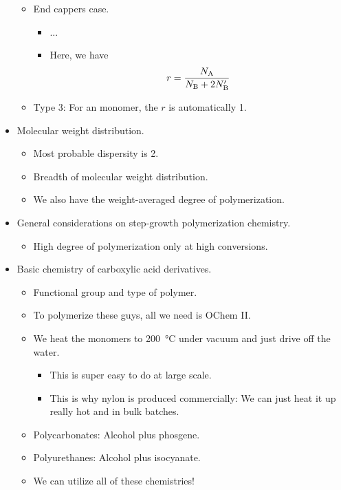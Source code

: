 \documentclass[../notes.tex]{subfiles}
\begin{document}
\begin{itemize}
\begin{itemize}
\begin{itemize}
        \end{itemize}
        \item End cappers case.
        \begin{itemize}
            \item ...
            \item Here, we have
            \begin{equation*}
                r = \frac{N_{\ce{A}}}{N_{\ce{B}}+2N_{\ce{B}}'}
            \end{equation*}
        \end{itemize}
        \item Type 3: For an  monomer, the $r$ is automatically 1.
    \end{itemize}
    \item Molecular weight distribution.
    \begin{itemize}
        \item Most probable dispersity is 2.
        \item Breadth of molecular weight distribution.
        \item We also have the weight-averaged degree of polymerization.
    \end{itemize}
    \item General considerations on step-growth polymerization chemistry.
    \begin{itemize}
        \item High degree of polymerization only at high conversions.
    \end{itemize}
    \item Basic chemistry of carboxylic acid derivatives.
    \begin{itemize}
        \item Functional group and type of polymer.
        \item To polymerize these guys, all we need is OChem II.
        \item We heat the monomers to \SI{200}{\celsius} under vacuum and just drive off the water.
        \begin{itemize}
            \item This is super easy to do at large scale.
            \item This is why nylon is produced commercially: We can just heat it up really hot and in bulk batches.
        \end{itemize}
        \item Polycarbonates: Alcohol plus phosgene.
        \item Polyurethanes: Alcohol plus isocyanate.
        \item We can utilize all of these chemistries!
    \end{itemize}
\end{itemize}
\end{document}

